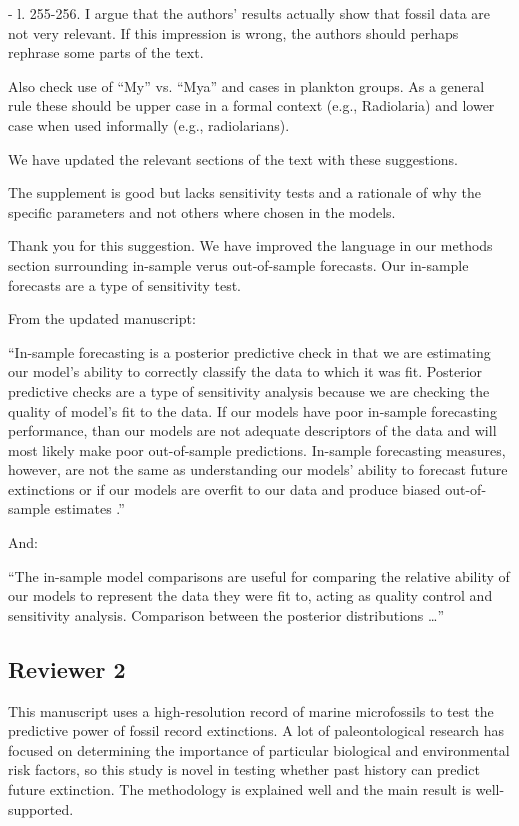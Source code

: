 \documentclass[12pt,letterpaper]{article}
\begin{document}
\begin{refsection}
\begin{bfseries}
  - l. 255-256. I argue that the authors’ results actually show that fossil data are not very relevant. If this impression is wrong, the authors should perhaps rephrase some parts of the text.

  Also check use of “My” vs. “Mya” and cases in plankton groups. As a general rule these should be upper case in a formal context (e.g., Radiolaria) and lower case when used informally (e.g., radiolarians). 
\end{bfseries}

We have updated the relevant sections of the text with these suggestions.

\begin{bfseries}
  The supplement is good but lacks sensitivity tests and a rationale of why the specific parameters and not others where chosen in the models. 
\end{bfseries}

Thank you for this suggestion. We have improved the language in our methods section surrounding in-sample verus out-of-sample forecasts. Our in-sample forecasts are a type of sensitivity test.

From the updated manuscript:

``In-sample forecasting is a posterior predictive check in that we are estimating our model's ability to correctly classify the data to which it was fit. Posterior predictive checks are a type of sensitivity analysis because we are checking the quality of model's fit to the data. If our models have poor in-sample forecasting performance, than our models are not adequate descriptors of the data and will most likely make poor out-of-sample predictions. In-sample forecasting measures, however, are not the same as understanding our models' ability to forecast future extinctions or if our models are overfit to our data and produce biased out-of-sample estimates \citep{ESL}.''

And:

``The in-sample model comparisons are useful for comparing the relative ability of our models to represent the data they were fit to, acting as quality control and sensitivity analysis. Comparison between the posterior distributions \dots''


\subsection{Reviewer 2}

\begin{bfseries}
  This manuscript uses a high-resolution record of marine microfossils to test the predictive power of fossil record extinctions. A lot of paleontological research has focused on determining the importance of particular biological and environmental risk factors, so this study is novel in testing whether past history can predict future extinction. The methodology is explained well and the main result is well-supported.


\end{bfseries}
\end{refsection}
\end{document}
